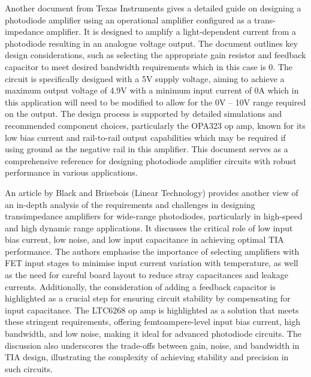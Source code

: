 \documentclass[conference]{IEEEtran}
\begin{document}
Another document from Texas Instruments \cite{Texas_Instruments} gives a detailed guide on designing a photodiode amplifier using an operational amplifier configured as a trans-impedance amplifier. It is designed to amplify a light-dependent current from a photodiode resulting in an analogue voltage output. The document outlines key design considerations, such as selecting the appropriate gain resistor and feedback capacitor to meet desired bandwidth requirements which in this case is 0. The circuit is specifically designed with a 5V supply voltage, aiming to achieve a maximum output voltage of 4.9V with a minimum input current of 0A which in this application will need to be modified to allow for the 0V – 10V range required on the output. The design process is supported by detailed simulations and recommended component choices, particularly the OPA323 op amp, known for its low bias current and rail-to-rail output capabilities which may be required if using ground as the negative rail in this amplifier. This document serves as a comprehensive reference for designing photodiode amplifier circuits with robust performance in various applications.

An article \cite{black_brisebois_2014} by Black and Brisebois (Linear Technology) provides another view of an in-depth analysis of the requirements and challenges in designing transimpedance amplifiers for wide-range photodiodes, particularly in high-speed and high dynamic range applications. It discusses the critical role of low input bias current, low noise, and low input capacitance in achieving optimal TIA performance. The authors emphasise the importance of selecting amplifiers with FET input stages to minimise input current variation with temperature, as well as the need for careful board layout to reduce stray capacitances and leakage currents. Additionally, the consideration of adding a feedback capacitor is highlighted as a crucial step for ensuring circuit stability by compensating for input capacitance. The LTC6268 op amp is highlighted as a solution that meets these stringent requirements, offering femtoampere-level input bias current, high bandwidth, and low noise, making it ideal for advanced photodiode circuits. The discussion also underscores the trade-offs between gain, noise, and bandwidth in TIA design, illustrating the complexity of achieving stability and precision in such circuits.
\end{document}
